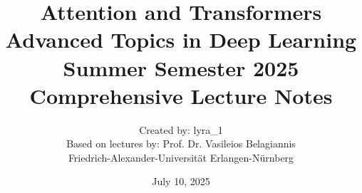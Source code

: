 
\title{\textbf{Attention and Transformers}\\[0.5cm]
\large Advanced Topics in Deep Learning\\
Summer Semester 2025\\[0.3cm]
Comprehensive Lecture Notes}
\author{Created by: lyra\_1\\
Based on lectures by: Prof. Dr. Vasileios Belagiannis\\
Friedrich-Alexander-Universität Erlangen-Nürnberg}
\date{July 10, 2025}
